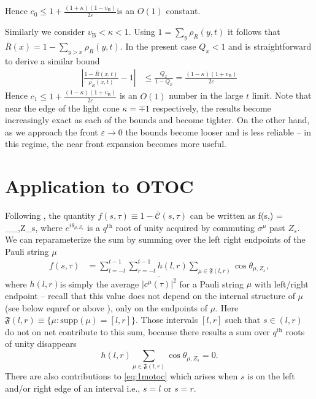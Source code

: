 \documentclass[aps,prb,twocolumn,superscriptaddress]{revtex4-1}
\begin{document}
Hence $c_{0}\leq1+\frac{\left(1+\kappa\right)\left(1-v_{\text{B}}\right)}{2\varepsilon}$is
an $O(1)$ constant.

Similarly we consider $v_{\text{B}}<\kappa<1$. Using $1=\sum_{y}\rho_{R}(y,t)$
it follows that $\overline{R}(x)=1-\sum_{y>x}\rho_{R}(y,t)$. In the
present case $Q_{x}<1$ and is straightforward to derive a similar
bound
\begin{align}\label{bound2}
\left|\frac{1-\overline{R}(x,t)}{\overline{\rho_{R}}(x,t)}-1\right| & \leq\frac{Q_{x}}{1-Q_{x}}=\frac{\left(1-\kappa\right)\left(1+v_{\text{B}}\right)}{2\varepsilon}
\end{align}
Hence $c_{1}\leq1+\frac{\left(1-\kappa\right)\left(1+v_{\text{B}}\right)}{2\varepsilon}$
is an $O(1)$ number in the large $t$ limit. Note that near the edge
of the light cone $\kappa=\mp 1 $ respectively, the results 
become increasingly exact as each of the bounds  and  become tighter. On the other hand, as we approach the front $\varepsilon\rightarrow 0$ the bounds become looser and  is less reliable -- in this regime, the near front expansion  becomes more useful.
 
 

\section{Application to OTOC}\label{app:otoc}
Following , the quantity $f(s,\tau)\equiv1-\overline{\mathcal{C}}(s,\tau)$ can
be written as
\be
f(s,\tau)  =  \sum_{\mu}\cos\theta_{\mu,Z_{s}},
\ee
where $e^{i\theta_{\mu,Z_{s}}}$ is a $q^{\text{th}}$ root of unity
acquired by commuting $\sigma^{\mu}$ past $Z_{s}$. We can reparameterize
the sum by summing over the left right endpoints of the Pauli string
$\mu$
\begin{align}
f(s,\tau) & =\sum_{l=-t}^{t-1}\sum_{r=-t}^{t-1}h(l,r)\sum_{\mu\in\mathfrak{F}(l,r)}\cos\theta_{\mu,Z_{s}},\label{eq:1motoc}
\end{align}
where $h(l,r)$is simply the average $\overline{\left|c^{\mu}(\tau)\right|^{2}}$
for a Pauli string $\mu$ with left/right endpoint -- recall that
this value does not depend on the internal structure of $\mu$(see
below eqnref or above ), only on the endpoints of $\mu$. Here $\mathfrak{F}(l,r)\equiv\{\mu:\text{supp}(\mu)=[l,r]\}$.
Those intervals $\left[l,r\right]$ such that $s\in(l,r)$ do not
on net contribute to this sum, because there results a sum over $q^{\text{th}}$
roots of unity disappears
\[
h(l,r)\sum_{\mu\in\mathfrak{F}(l,r)}\cos\theta_{\mu,Z_{s}}=0.
\]
There are also contributions to \eqref{eq:1motoc} which arises when
$s$ is on the left and/or right edge of an interval i.e., $s=l$
or $s=r$.
\end{document}
